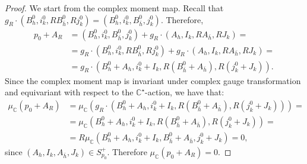 \documentclass[12pt,oneside,reqno]{amsart}
\theoremstyle{definition}
\numberwithin{equation}{section}
\numberwithin{theorem}{section}
\newcommand{\C}{\mathbb{C}}
\begin{document}
%
\begin{proof}
   We start from the complex moment map. Recall that $g_R\cdot (B_h^0,i_k^0,RB_{\bar h}^0,Rj_k^0)=(B_h^0,i_k^0,B_{\bar h}^0,j_k^0).$ Therefore,
   \begin{equation*}
       \begin{split}
           p_0+A_R&=(B_h^0,i_k^0,B_{\bar h}^0,j_k^0)+g_R\cdot (A_h,I_k,RA_{\bar h},RJ_k)= \\
           &=g_R\cdot (B_h^0,i_k^0,RB_{\bar h}^0,Rj_k^0)+g_R\cdot (A_h,I_k,RA_{\bar h},RJ_k)= \\
           &=g_R\cdot (B_h^0+A_h,i_k^0+I_k,R(B_{\bar h}^0+A_{\bar h}),R(j_k^0+J_k)).
       \end{split}
   \end{equation*}
   Since the complex moment map is invariant under complex gauge transformation and equivariant with respect to the $\C^{\star}$-action, we have that:
   \begin{equation*}
       \begin{split}
           \mu_\C(p_0+A_R)&=\mu_\C(g_R\cdot (B_h^0+A_h,i_k^0+I_k,R(B_{\bar h}^0+A_{\bar h}),R(j_k^0+J_k)))=\\
           &=\mu_\C(B_h^0+A_h,i_k^0+I_k,R(B_{\bar h}^0+A_{\bar h}),R(j_k^0+J_k))= \\
           &=R \mu_\C (B_h^0+A_h,i_k^0+I_k,B_{\bar h}^0+A_{\bar h},j_k^0+J_k)=0,
       \end{split}
   \end{equation*}
   since $(A_h,I_k,A_{\bar h},J_k) \in S_{p_0}^+$. Therefore $\mu_\C(p_0+A_R)=0.$


\end{proof}
\end{document}

